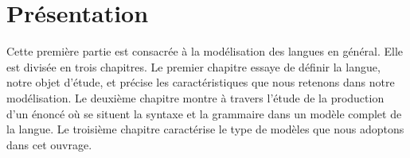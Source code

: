 \section*{Présentation}

Cette première partie est consacrée à la modélisation des langues en général. Elle est divisée en trois chapitres. Le premier chapitre essaye de définir la langue, notre objet d’étude, et précise les caractéristiques que nous retenons dans notre modélisation. Le deuxième chapitre montre à travers l’étude de la production d’un énoncé où se situent la syntaxe et la grammaire dans un modèle complet de la langue. Le troisième chapitre caractérise le type de modèles que nous adoptons dans cet ouvrage.
